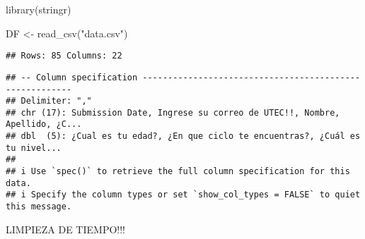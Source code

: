\documentclass[
]{article}
\newenvironment{Shaded}{\begin{snugshade}}{\end{snugshade}}
\newcommand{\FunctionTok}[1]{\textcolor[rgb]{0.00,0.00,0.00}{#1}}
\newcommand{\NormalTok}[1]{#1}
\newcommand{\OtherTok}[1]{\textcolor[rgb]{0.56,0.35,0.01}{#1}}
\newcommand{\StringTok}[1]{\textcolor[rgb]{0.31,0.60,0.02}{#1}}
\begin{document}
\begin{Shaded}
\begin{Highlighting}[]
\FunctionTok{library}\NormalTok{(stringr)}

\NormalTok{DF }\OtherTok{\textless{}{-}} \FunctionTok{read\_csv}\NormalTok{(}\StringTok{"data.csv"}\NormalTok{)}
\end{Highlighting}
\end{Shaded}

\begin{verbatim}
## Rows: 85 Columns: 22
\end{verbatim}

\begin{verbatim}
## -- Column specification --------------------------------------------------------
## Delimiter: ","
## chr (17): Submission Date, Ingrese su correo de UTEC!!, Nombre, Apellido, ¿C...
## dbl  (5): ¿Cual es tu edad?, ¿En que ciclo te encuentras?, ¿Cuál es tu nivel...
## 
## i Use `spec()` to retrieve the full column specification for this data.
## i Specify the column types or set `show_col_types = FALSE` to quiet this message.
\end{verbatim}

LIMPIEZA DE TIEMPO!!!
\end{document}
